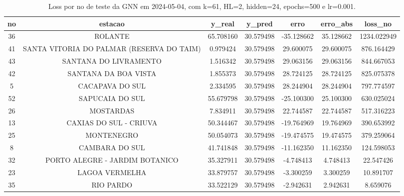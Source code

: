 \begin{table}[h]
\centering
\caption{Loss por no de teste da GNN em 2024-05-04, com k=61, HL=2, hidden=24, epochs=500 e lr=0.001.}
\label{tab:gnn_loss_k61_hl2_h24_e500_d20240504}
\begin{tabular}{ccccccc}
\toprule
no & estacao & y\_real & y\_pred & erro & erro\_abs & loss\_no \\
\midrule
36 & ROLANTE & 65.708160 & 30.579498 & -35.128662 & 35.128662 & 1234.022949 \\
41 & SANTA VITORIA DO PALMAR (RESERVA DO TAIM) & 0.979424 & 30.579498 & 29.600075 & 29.600075 & 876.164429 \\
43 & SANTANA DO LIVRAMENTO & 1.516342 & 30.579498 & 29.063156 & 29.063156 & 844.667053 \\
42 & SANTANA DA BOA VISTA & 1.855373 & 30.579498 & 28.724125 & 28.724125 & 825.075378 \\
5 & CACAPAVA DO SUL & 2.334595 & 30.579498 & 28.244904 & 28.244904 & 797.774597 \\
52 & SAPUCAIA DO SUL & 55.679798 & 30.579498 & -25.100300 & 25.100300 & 630.025024 \\
26 & MOSTARDAS & 7.834911 & 30.579498 & 22.744587 & 22.744587 & 517.316223 \\
13 & CAXIAS DO SUL - CRIUVA & 50.344467 & 30.579498 & -19.764969 & 19.764969 & 390.653992 \\
25 & MONTENEGRO & 50.054073 & 30.579498 & -19.474575 & 19.474575 & 379.259064 \\
8 & CAMBARA DO SUL & 41.741848 & 30.579498 & -11.162350 & 11.162350 & 124.598053 \\
32 & PORTO ALEGRE - JARDIM BOTANICO & 35.327911 & 30.579498 & -4.748413 & 4.748413 & 22.547426 \\
23 & LAGOA VERMELHA & 33.879757 & 30.579498 & -3.300259 & 3.300259 & 10.891707 \\
35 & RIO PARDO & 33.522129 & 30.579498 & -2.942631 & 2.942631 & 8.659076 \\
\bottomrule
\end{tabular}
\end{table}

